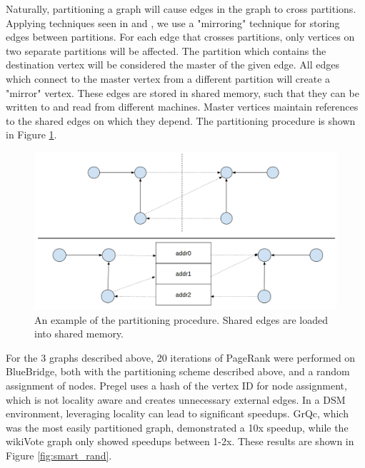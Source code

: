 Naturally, partitioning a graph will cause edges in the graph to cross 
partitions. Applying techniques seen in \cite{Chen:2015:powerlyra} and
\cite{Tian:2013:thinklikeagraph}, we use a "mirroring" technique for storing
edges between partitions. For each edge that crosses partitions, only vertices
on two separate partitions will be affected. The partition which contains the 
destination vertex will be considered the master of the given edge. All edges 
which connect to the master vertex from a different partition will create a
"mirror" vertex. These edges are stored in shared memory, such that they can
be written to and read from different machines. Master vertices maintain 
references to the shared edges on which they depend. The partitioning procedure
is shown in Figure \ref{fig:partition}.

\begin{figure}[h]
\includegraphics[width=\linewidth]{"fig/partition_example"}
\caption{An example of the partitioning procedure. Shared edges are loaded into
shared memory.}
\label{fig:partition}
\end{figure}

For the 3 graphs described above, 20 iterations of PageRank were performed on
BlueBridge, both with the partitioning scheme described above, and a random
assignment of nodes. Pregel uses a hash of the vertex ID for node assignment,
~\cite{Malewicz:2010:PSL:1807167.1807184} which is not locality aware and
creates unnecessary external edges. In a DSM environment, leveraging locality
can lead to significant speedups. GrQc, which was the most easily partitioned
graph, demonstrated a 10x speedup, while the wikiVote graph only showed speedups
between 1-2x. These results are shown in Figure \ref{fig:smart_rand}.

